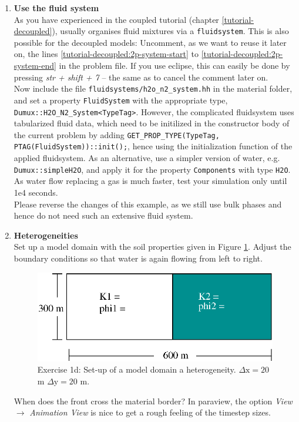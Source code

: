 \begin{enumerate}
\item \textbf{Use the \Dumux fluid system} \\
As you have experienced in the coupled tutorial (chapter \ref{tutorial-decoupled}), \Dumux usually organises fluid mixtures via a \texttt{fluidsystem}. This is also possible for the decoupled models: Uncomment, as we want to reuse it later on, the lines \ref{tutorial-decoupled:2p-system-start} to \ref{tutorial-decoupled:2p-system-end} in the problem file. If you use eclipse, this can easily be done by pressing \textit{str + shift + 7} -- the same as to cancel the comment later on.\\
Now include the file \texttt{fluidsystems/h2o\_n2\_system.hh} in the material folder, and set a property \texttt{FluidSystem} with the appropriate type, \texttt{Dumux::H2O\_N2\_System<TypeTag>}. However, the complicated fluidsystem uses tabularized fluid data, which need to be initilized in the constructor body of the current problem by adding \texttt{GET\_PROP\_TYPE(TypeTag, PTAG(FluidSystem))::init();}, hence using the initialization function of the applied fluidsystem. As an alternative, use a simpler version of water, e.g. \texttt{Dumux::simpleH2O}, and apply it for the property \texttt{Components} with type \texttt{H2O}. As water flow replacing a gas is much faster, test your simulation only until 1e4 seconds.\\
Please reverse the changes of this example, as we still use bulk phases and hence do not need such an extensive fluid system.
 
\item \textbf{Heterogeneities}  \\
Set up a model domain with the soil properties given in Figure \ref{tutorial-deoucpled:exercise1_d}. Adjust the boundary conditions so that water is again flowing from left to right.
\begin{figure}[h]
\centering
\includegraphics[width=0.5\linewidth,keepaspectratio]{EPS/exercise1_c.eps}
\caption{Exercise 1d: Set-up of a model domain a heterogeneity. $\Delta \text{x} = 20$ m $\Delta \text{y} = 20$ m.}\label{tutorial-deoucpled:exercise1_d}
\end{figure}
When does the front cross the material border? In paraview, the option \textit{View} $\rightarrow$ \textit{Animation View} is nice to get a rough feeling of the timestep sizes.
\end{enumerate}

